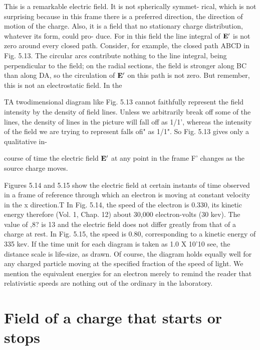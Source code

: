 This is a remarkable electric field. It is not spherically symmet-
rical, which is not surprising because in this frame there is a preferred
direction, the direction of motion of the charge. Also, it is a field
that no stationary charge distribution, whatever its form, could pro-
duce. For in this field the line integral of $\mathbf{E}'$ is not zero around every
closed path. Consider, for example, the closed path ABCD in
Fig. 5.13. The circular arcs contribute nothing to the line integral,
being perpendicular to the field; on the radial sections, the field is
stronger along BC than along DA, so the circulation of $\mathbf{E}'$ on this path
is not zero. But remember, this is not an electrostatic field. In the

TA twodimensional diagram like Fig. 5.13 cannot faithfully represent the field intensity
by the density of field lines. Unless we arbitrarily break off some of the lines,
the density of lines in the picture will fall off as 1/1', whereas the intensity of the field
we are trying to represent falls ofi" as 1/1". So Fig. 5.13 gives only a qualitative in-

 

course of time the electric field $\mathbf{E}'$ at any point in the frame F' changes
as the source charge moves.

Figures 5.14 and 5.15 show the electric field at certain instants of
time observed in a frame of reference through which an electron is
moving at constant velocity in the x direction.T In Fig. 5.14, the
speed of the electron is 0.330, its kinetic energy therefore (Vol. 1,
Chap. 12) about 30,000 electron-volts (30 kev). The value of ,8?
is 13 and the electric field does not differ greatly from that of a charge
at rest. In Fig. 5.15, the speed is 0.80, corresponding to a kinetic
energy of 335 kev. If the time unit for each diagram is taken as
1.0 X 10'10 see, the distance scale is life-size, as drawn. Of course,
the diagram holds equally well for any charged particle moving at
the specified fraction of the speed of light. We mention the equivalent
energies for an electron merely to remind the reader that relativistic
speeds are nothing out of the ordinary in the laboratory.

\section{Field of a charge that starts or stops}

